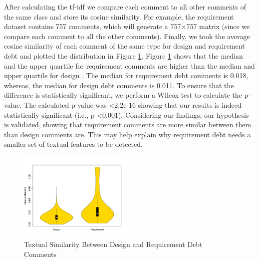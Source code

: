 After calculating the tf-idf we compare each comment to all other comments of the same class and store its cosine similarity. For example, the requirement \SATD dataset contains 757 comments, which will generate a 757$\times$757 matrix (since we compare each comment to all the other comments). Finally, we took the average cosine similarity of each comment of the same type for design and requirement debt and plotted the distribution in Figure \ref{fig:textual_similarity}. Figure \ref{fig:textual_similarity} shows that the median and the upper quartile for requirement \SATD comments are higher than the median and upper quartile for design \SATD. The median for requirement debt comments is 0.018, whereas, the median for design debt comments is 0.011. To ensure that the difference is statistically significant, we perform a Wilcox test to calculate the p-value. The calculated p-value was \textless 2.2e-16 showing that our results is indeed statistically significant (i.e., p \textless 0.001). Considering our findings, our hypothesis is validated, showing that requirement \SATD comments are more similar between them than design \SATD comments are. This may help explain why requirement debt needs a smaller set of textual features to be detected.

\begin{figure}[t]
  \centering
  \includegraphics[width = 0.48\textwidth]{figures/textual_similarity_removing_stop_words.pdf}
  \vspace{-3mm}
  \caption{Textual Similarity Between Design and Requirement Debt Comments}
  \label{fig:textual_similarity}
\end{figure}


